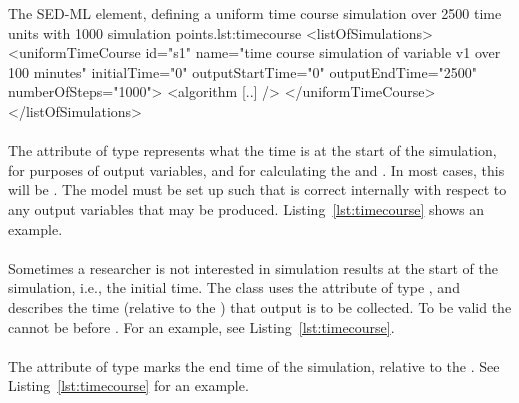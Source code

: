 
\begin{myXmlLst}{The SED-ML  element, defining a uniform time course simulation over 2500 time units with 1000 simulation points.}{lst:timecourse}
<listOfSimulations>
	<uniformTimeCourse id="s1"  name="time course simulation of variable v1 over 100 minutes"  
		initialTime="0" outputStartTime="0" outputEndTime="2500" numberOfSteps="1000">
		<algorithm [..] />
 	</uniformTimeCourse>
</listOfSimulations>
\end{myXmlLst}

\paragraph*{}
\label{sec:initialTime}
The attribute  of type  represents what the time is at the start of the simulation, for purposes of output variables, and for calculating the  and .  In most cases, this will be .  The model must be set up such that  is correct internally with respect to any output variables that may be produced.
Listing~\ref{lst:timecourse} shows an example. 

\paragraph*{}
\label{sec:outputStartTime}
Sometimes a researcher is not interested in simulation results at the start of the simulation, i.e., the initial time. The \hyperref[class:uniformTimeCourse]{} class uses the attribute  of type , and describes the time (relative to the ) that output is to be collected. To be valid the  cannot be before \hyperref[sec:initialTime]{}. For an example, see Listing~\ref{lst:timecourse}. 

\paragraph*{}
\label{sec:outputEndTime}
The attribute  of type  marks the end time of the simulation, relative to the . See Listing~\ref{lst:timecourse} for an example. 

